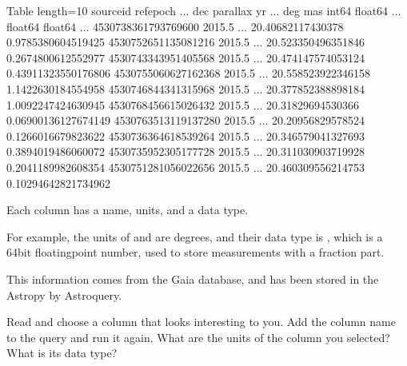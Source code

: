 \documentclass[letterpaper,10pt,english]{sphinxmanual}
\begin{document}
\begin{sphinxVerbatim}[commandchars=\\\{\}]
\PYGZlt{}Table length=10\PYGZgt{}
     source\PYGZus{}id      ref\PYGZus{}epoch ...        dec               parallax      
                        yr    ...        deg                 mas         
       int64         float64  ...      float64             float64       
\PYGZhy{}\PYGZhy{}\PYGZhy{}\PYGZhy{}\PYGZhy{}\PYGZhy{}\PYGZhy{}\PYGZhy{}\PYGZhy{}\PYGZhy{}\PYGZhy{}\PYGZhy{}\PYGZhy{}\PYGZhy{}\PYGZhy{}\PYGZhy{}\PYGZhy{}\PYGZhy{}\PYGZhy{} \PYGZhy{}\PYGZhy{}\PYGZhy{}\PYGZhy{}\PYGZhy{}\PYGZhy{}\PYGZhy{}\PYGZhy{}\PYGZhy{} ... \PYGZhy{}\PYGZhy{}\PYGZhy{}\PYGZhy{}\PYGZhy{}\PYGZhy{}\PYGZhy{}\PYGZhy{}\PYGZhy{}\PYGZhy{}\PYGZhy{}\PYGZhy{}\PYGZhy{}\PYGZhy{}\PYGZhy{}\PYGZhy{}\PYGZhy{}\PYGZhy{} \PYGZhy{}\PYGZhy{}\PYGZhy{}\PYGZhy{}\PYGZhy{}\PYGZhy{}\PYGZhy{}\PYGZhy{}\PYGZhy{}\PYGZhy{}\PYGZhy{}\PYGZhy{}\PYGZhy{}\PYGZhy{}\PYGZhy{}\PYGZhy{}\PYGZhy{}\PYGZhy{}\PYGZhy{}\PYGZhy{}
4530738361793769600    2015.5 ...  20.40682117430378   0.9785380604519425
4530752651135081216    2015.5 ... 20.523350496351846   0.2674800612552977
4530743343951405568    2015.5 ... 20.474147574053124 \PYGZhy{}0.43911323550176806
4530755060627162368    2015.5 ... 20.558523922346158   1.1422630184554958
4530746844341315968    2015.5 ... 20.377852388898184   1.0092247424630945
4530768456615026432    2015.5 ...  20.31829694530366 \PYGZhy{}0.06900136127674149
4530763513119137280    2015.5 ...  20.20956829578524   0.1266016679823622
4530736364618539264    2015.5 ... 20.346579041327693   0.3894019486060072
4530735952305177728    2015.5 ... 20.311030903719928   0.2041189982608354
4530751281056022656    2015.5 ... 20.460309556214753  0.10294642821734962
\end{sphinxVerbatim}

Each column has a name, units, and a data type.

For example, the units of  and  are degrees, and their data type is , which is a 64\sphinxhyphen{}bit floating\sphinxhyphen{}point number, used to store measurements with a fraction part.

This information comes from the Gaia database, and has been stored in the Astropy  by Astroquery.

 Read  and choose a column that looks interesting to you.  Add the column name to the query and run it again.  What are the units of the column you selected?  What is its data type?
\end{document}
